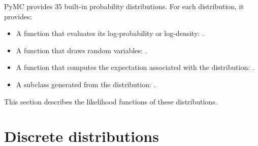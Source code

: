 PyMC provides 35 built-in probability distributions. For each distribution, it provides:
\begin{itemize}
    \item A function that evaluates its log-probability or log-density: .
    \item A function that draws random variables: .
    \item A function that computes the expectation associated with the distribution: .
    \item A  subclass generated from the distribution: .
\end{itemize} 
This section describes the likelihood functions of these distributions. 

\newenvironment{paramlist}{
\begin{list}{}{
\setlength{\itemsep}{-2pt}
\setlength{\parsep}{-1pt}
\setlength{\topsep}{-1pt}}
 }{\end{list}}

 

\section{Discrete distributions}

